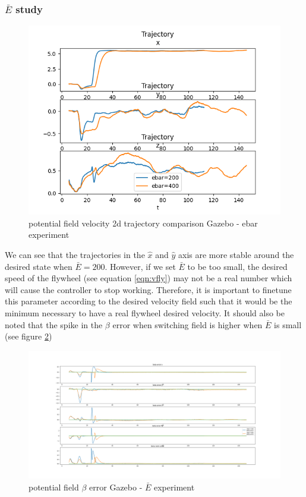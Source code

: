 \subsubsection{$\bar{E}$ study}
\begin{figure}[h!]
   \centering
   \includegraphics[width=\linewidth]{Images/gazebo_trajectory_ebar_potential_2d.png}
   \caption{potential field velocity 2d trajectory comparison Gazebo - ebar experiment}
   \label{fig:vel2dgazeboebarpotential}
\end{figure}
We can see that the trajectories in the $\hat{x}$ and $\hat{y}$ axis are more stable around the desired state when $\bar{E}=200$.
However, if we set $\bar{E}$ to be too small, the desired speed of the flywheel (see equation \ref{eqn:vfly}) may not be a real number which will cause the controller to stop working.
Therefore, it is important to finetune this parameter according to the desired velocity field such that it would be the minimum necessary to have a real flywheel desired velocity.
It should also be noted that the spike in the $\beta$ error when switching field is higher when $\bar{E}$ is small (see figure \ref{fig:betaerrorgazebopotentialebar})
\begin{figure}[h!]
   \centering
   \includegraphics[width=\linewidth]{Images/gazebo_betaerror_ebar_potential.png}
   \caption{potential field $\beta$ error Gazebo - $\bar{E}$ experiment}
   \label{fig:betaerrorgazebopotentialebar}
\end{figure}

